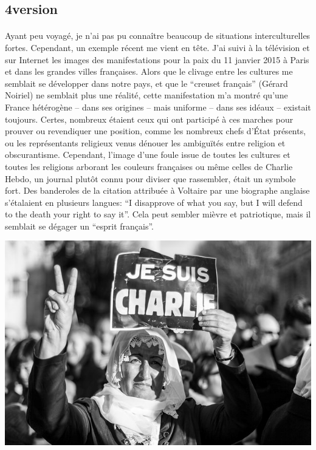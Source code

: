 \subsection{4\ieme version}

\paragraph{} Ayant peu voyagé, je n'ai pas pu connaître beaucoup de situations
interculturelles fortes. Cependant, un exemple récent me vient en tête. J'ai
suivi à la télévision et sur Internet les images des manifestations pour la
paix du 11 janvier 2015 à Paris et dans les grandes villes françaises. Alors
que le clivage entre les cultures me semblait se développer dans notre pays, et
que le ``creuset français'' (Gérard Noiriel) ne semblait plus une réalité,
cette manifestation m'a montré qu'une France hétérogène – dans ses origines –
mais uniforme – dans ses idéaux – existait toujours. Certes, nombreux étaient
ceux qui ont participé à ces marches pour prouver ou revendiquer une position,
comme les nombreux chefs d'État présents, ou les représentants religieux venus
dénouer les ambiguïtés entre religion et obscurantisme. Cependant, l'image
d'une foule issue de toutes les cultures et toutes les religions arborant les
couleurs françaises ou même celles de Charlie Hebdo, un journal plutôt connu
pour diviser que rassembler, était un symbole fort. Des banderoles de la
citation attribuée à Voltaire par une biographe anglaise s'étalaient en
plusieurs langues: ``I disapprove of what you say, but I will defend to the
death your right to say it''. Cela peut sembler mièvre et patriotique, mais il
semblait se dégager un ``esprit français''.

\begin{center}
	\includegraphics[scale=0.5]{charlie.jpg}
\end{center}

